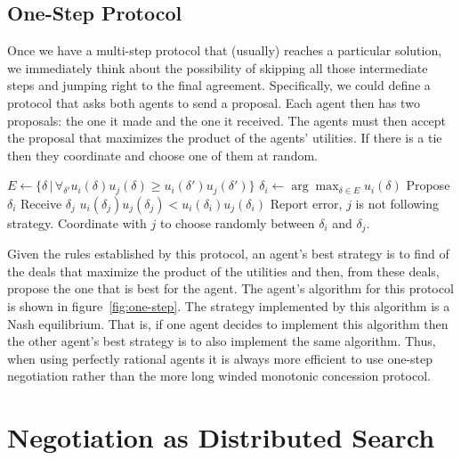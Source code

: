 \subsection{One-Step Protocol}
\label{sec:one-step-protocol}

Once we have a multi-step protocol that (usually) reaches a particular
solution, we immediately think about the possibility of skipping all
those intermediate steps and jumping right to the final agreement.
Specifically, we could define a protocol that asks both agents to send
a proposal. Each agent then has two proposals: the one it made and the
one it received. The agents must then accept the proposal that
maximizes the product of the agents' utilities. If there is a tie then
they coordinate and choose one of them at random.

\begin{SCfigure}
  \begin{minipage}{1.0\linewidth}
\begin{codebox}
  \li $E \gets \{\delta \,|\, \forall_{\delta'} u_i(\delta)u_j(\delta) \geq u_i(\delta')u_j(\delta')\}$ 
  \li $\delta_i \gets \arg \max_{\delta \in E} u_i(\delta)$
  \li Propose $\delta_i$
  \li Receive $\delta_j$
  \li \If $u_i(\delta_j)u_j(\delta_j) < u_i(\delta_i) u_j(\delta_i)$ 
  \li     \Then Report error, $j$ is not following strategy.
  \End
  \li Coordinate with $j$ to choose randomly between $\delta_i$ and
  $\delta_j$.
\end{codebox}
\end{minipage}
\caption{The one step negotiation protocol \cite{rosenschein94a}.}
\label{fig:one-step}
\end{SCfigure}

Given the rules established by this protocol, an agent's best strategy
is to find of the deals that maximize the product of the utilities and
then, from these deals, propose the one that is best for the agent.
The agent's algorithm for this  protocol is
shown in figure~\ref{fig:one-step}.  The strategy implemented by this
algorithm is a Nash equilibrium. That is, if one agent decides to
implement this algorithm then the other agent's best strategy is to
also implement the same algorithm. Thus, when using perfectly rational
agents it is always more efficient to use one-step negotiation rather
than the more long winded monotonic concession protocol.

\section{Negotiation as Distributed Search}
\label{sec:negotiation-as-distr}

